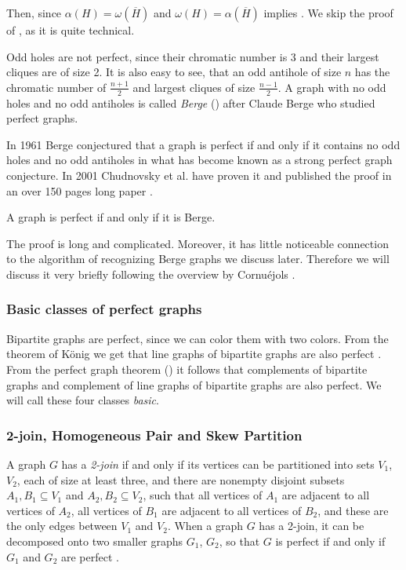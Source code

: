 
Then, since $\alpha(H) = \omega(\overline{H})$ and $\omega(H) = \alpha(\overline{H})$  implies . We skip the proof of , as it is quite technical.

Odd holes are not perfect, since their chromatic number is 3 and their largest cliques are of size 2. It is also easy to see, that an odd antihole of size $n$ has the chromatic number of $\frac{n+1}{2}$ and largest cliques of size $\frac{n-1}{2}$. A graph with no odd holes and no odd antiholes is called \emph{Berge} () after Claude Berge who studied perfect graphs.

In 1961 Berge conjectured that a graph is perfect if and only if it contains no odd holes and no odd antiholes in what has become known as a strong perfect graph conjecture. In 2001 Chudnovsky et al. have proven it and published the proof in an over 150 pages long paper  \cite{MC06}.

\begin{theorem}
	\label{thm:spgt}
	A graph is perfect if and only if it is Berge.
\end{theorem}

The proof is long and complicated. Moreover, it has little noticeable connection to the algorithm of recognizing Berge graphs we discuss later. Therefore we will discuss it very briefly following the overview by Cornuéjols \cite{GC03}.

\subsubsection{Basic classes of perfect graphs}
Bipartite graphs are perfect, since we can color them with two colors. From the theorem of König \cite{Knig1916} we get that line graphs of bipartite graphs are also perfect \cite{GC03}. From the perfect graph theorem () it follows that complements of bipartite graphs and complement of line graphs of bipartite graphs are also perfect. We will call these four classes \emph{basic}.

\subsubsection{2-join, Homogeneous Pair and Skew Partition}
A graph $G$ has a \emph{2-join} if and only if its vertices can be partitioned into sets $V_1$, $V_2$, each of size at least three, and there are nonempty disjoint subsets $A_1, B_1 \subseteq V_1$ and $A_2, B_2 \subseteq V_2$, such that all vertices of $A_1$ are adjacent to all vertices of $A_2$, all vertices of $B_1$ are adjacent to all vertices of $B_2$, and these are the only edges between $V_1$ and $V_2$. When a graph $G$ has a 2-join, it can be decomposed onto two smaller graphs $G_1$, $G_2$, so that $G$ is perfect if and only if $G_1$ and $G_2$ are perfect \cite{Cornujols1985}.

